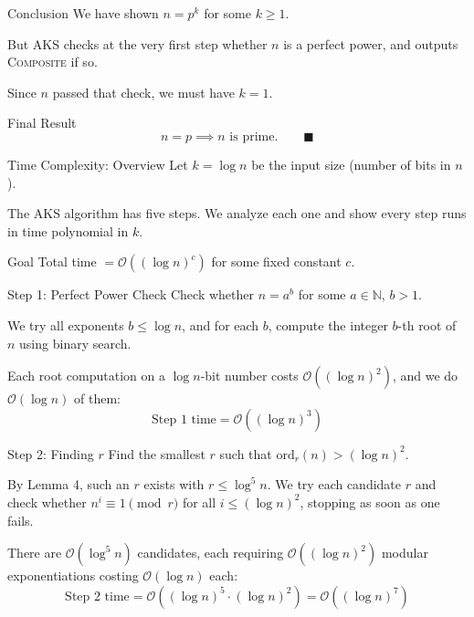\documentclass{beamer}
\begin{document}

\begin{frame}{Conclusion}
We have shown $n = p^k$ for some $k \ge 1$.

But AKS checks at the very first step whether $n$ is a perfect power,
and outputs \textsc{Composite} if so.

Since $n$ passed that check, we must have $k = 1$.

\begin{block}{Final Result}
\[
    n = p \implies n \text{ is prime.} \qquad \blacksquare
\]
\end{block}
\end{frame}
\begin{frame}{Time Complexity: Overview}
Let $k = \log n$ be the input size (number of bits in $n$).

The AKS algorithm has five steps. We analyze each one and
show every step runs in time polynomial in $k$.

\begin{block}{Goal}
Total time $= \mathcal{O}((\log n)^c)$ for some fixed constant $c$.
\end{block}
\end{frame}


\begin{frame}{Step 1: Perfect Power Check}
Check whether $n = a^b$ for some $a \in \mathbb{N}$, $b > 1$.

We try all exponents $b \le \log n$, and for each $b$, compute
the integer $b$-th root of $n$ using binary search.

Each root computation on a $\log n$-bit number costs $\mathcal{O}((\log n)^2)$,
and we do $\mathcal{O}(\log n)$ of them:
\[
    \text{Step 1 time} = \mathcal{O}((\log n)^3)
\]
\end{frame}


\begin{frame}{Step 2: Finding $r$}
Find the smallest $r$ such that $\mathrm{ord}_r(n) > (\log n)^2$.

By Lemma 4, such an $r$ exists with $r \le \log^5 n$.
We try each candidate $r$ and check whether $n^i \equiv 1 \pmod{r}$
for all $i \le (\log n)^2$, stopping as soon as one fails.

There are $\mathcal{O}(\log^5 n)$ candidates, each requiring
$\mathcal{O}((\log n)^2)$ modular exponentiations costing $\mathcal{O}(\log n)$ each:
\[
    \text{Step 2 time} = \mathcal{O}((\log n)^5 \cdot (\log n)^2) = \mathcal{O}((\log n)^7)
\]
\end{frame}
\end{document}
